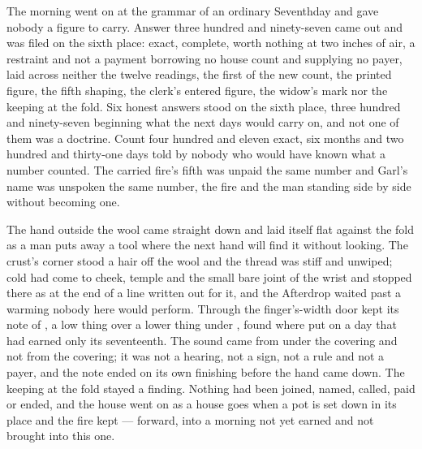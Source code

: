 The morning went on at the grammar of an ordinary Seventhday and gave nobody a figure to carry. Answer three hundred and ninety-seven came out and was filed on the sixth place: exact, complete, worth nothing at two inches of air, a restraint and not a payment borrowing no house count and supplying no payer, laid across neither the twelve readings, the first of the new count, the printed figure, the fifth shaping, the clerk's entered figure, the widow's mark nor the keeping at the fold. Six honest answers stood on the sixth place, three hundred and ninety-seven beginning what the next days would carry on, and not one of them was a doctrine. Count four hundred and eleven exact, six months and two hundred and thirty-one days told by nobody who would have known what a number counted. The carried fire's fifth was unpaid the same number and Garl's name was unspoken the same number, the fire and the man standing side by side without becoming one.

The hand outside the wool came straight down and laid itself flat against the fold as a man puts away a tool where the next hand will find it without looking. The crust's corner stood a hair off the wool and the thread was stiff and unwiped; cold had come to cheek, temple and the small bare joint of the wrist and stopped there as at the end of a line written out for it, and the Afterdrop waited past a warming nobody here would perform. Through the finger's-width door  kept its note of , a low thing over a lower thing under , found where put on a day that had earned only its seventeenth. The sound came from under the covering and not from the covering; it was not a hearing, not a sign, not a rule and not a payer, and the note ended on its own finishing before the hand came down. The keeping at the fold stayed a finding. Nothing had been joined, named, called, paid or ended, and the house went on as a house goes when a pot is set down in its place and the fire kept --- forward, into a morning not yet earned and not brought into this one.
